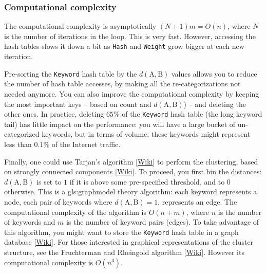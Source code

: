 \documentclass[oneside,10pt]{book}
\begin{document}
\subsubsection{Computational complexity}

The computational complexity is asymptotically $(N+1)m = O(n)$, where $N$ is the number of iterations in the loop. This is very fast. However, accessing the hash tables slows it down a bit  as \texttt{Hash} and \texttt{Weight} grow bigger at each new iteration.

Pre-sorting the \texttt{Keyword} hash table  by the $d(\text{A}, \text{B})$ values allows you to  reduce the number of hash table accesses, by making all the re-categorizations not needed anymore.
You can also improve the computational complexity by keeping the most important keys -- based on count and $d(\text{A},\text{B})$) -- and deleting the other ones. In practice, deleting $65\%$ of the \texttt{Keyword} hash table (the long keyword tail) has  little impact on the performance: you will have a large bucket of un-categorized keywords, but in terms of volume, these keywords might represent less than $0.1\%$ of the Internet traffic.

Finally, one could use \textcolor{index}{Tarjan's  algorithm} [\href{https://en.wikipedia.org/wiki/Tarjan\%27s_strongly_connected_components_algorithm}{Wiki}] to perform the clustering, based on strongly \textcolor{index}{connected components} [\href{https://en.wikipedia.org/wiki/Component_(graph_theory)}{Wiki}]. To proceed, you first bin the distances:
$d(\text{A}, \text{B})$ is set to $1$ if it is above some pre-specified threshold, and to $0$ otherwise. This is a \gls{gls:graphmodel} theory algorithm: each keyword represents a node, each pair of keywords where $d(\text{A}, \text{B}) = 1$, represents an edge. The computational complexity of the algorithm is $O(n + m)$, where $n$ is the number of keywords and $m$ is the number of keyword pairs (edges). To take advantage of this algorithm, you might want to store the \texttt{Keyword} hash table in a
\textcolor{index}{graph database} [\href{https://en.wikipedia.org/wiki/Graph_database}{Wiki}]. For those interested in graphical representations of the cluster structure, see the
\textcolor{index}{Fruchterman and Rheingold algorithm} [\href{https://en.wikipedia.org/wiki/Force-directed_graph_drawing}{Wiki}]. However its computational complexity is $O(n^3)$.
\end{document}
